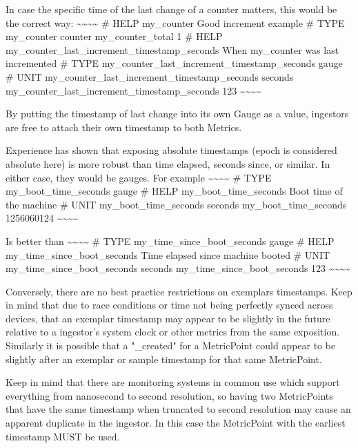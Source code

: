 \documentclass[a4paper,12pt,notitlepage,twoside,openright]{article}
\begin{document}
In case the specific time of the last change of a counter matters, this
would be the correct way:
\textasciitilde\textasciitilde\textasciitilde\textasciitilde{} \# HELP
my\_counter Good increment example \# TYPE my\_counter counter
my\_counter\_total 1 \# HELP
my\_counter\_last\_increment\_timestamp\_seconds When my\_counter was
last incremented \# TYPE
my\_counter\_last\_increment\_timestamp\_seconds gauge \# UNIT
my\_counter\_last\_increment\_timestamp\_seconds seconds
my\_counter\_last\_increment\_timestamp\_seconds 123
\textasciitilde\textasciitilde\textasciitilde\textasciitilde{}

By putting the timestamp of last change into its own Gauge as a value,
ingestors are free to attach their own timestamp to both Metrics.

Experience has shown that exposing absolute timestamps (epoch is
considered absolute here) is more robust than time elapsed, seconds
since, or similar. In either case, they would be gauges. For example
\textasciitilde\textasciitilde\textasciitilde\textasciitilde{} \# TYPE
my\_boot\_time\_seconds gauge \# HELP my\_boot\_time\_seconds Boot time
of the machine \# UNIT my\_boot\_time\_seconds seconds
my\_boot\_time\_seconds 1256060124
\textasciitilde\textasciitilde\textasciitilde\textasciitilde{}

Is better than
\textasciitilde\textasciitilde\textasciitilde\textasciitilde{} \# TYPE
my\_time\_since\_boot\_seconds gauge \# HELP
my\_time\_since\_boot\_seconds Time elapsed since machine booted \# UNIT
my\_time\_since\_boot\_seconds seconds my\_time\_since\_boot\_seconds
123 \textasciitilde\textasciitilde\textasciitilde\textasciitilde{}

Conversely, there are no best practice restrictions on exemplars
timestamps. Keep in mind that due to race conditions or time not being
perfectly synced across devices, that an exemplar timestamp may appear
to be slightly in the future relative to a ingestor's system clock or
other metrics from the same exposition. Similarly it is possible that a
"\_created" for a MetricPoint could appear to be slightly after an
exemplar or sample timestamp for that same MetricPoint.

Keep in mind that there are monitoring systems in common use which
support everything from nanosecond to second resolution, so having two
MetricPoints that have the same timestamp when truncated to second
resolution may cause an apparent duplicate in the ingestor. In this case
the MetricPoint with the earliest timestamp MUST be used.
\end{document}
